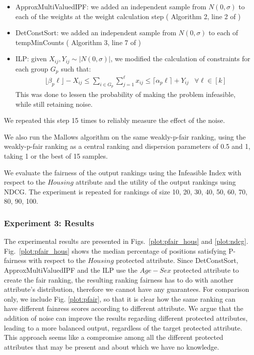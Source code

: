 \begin{itemize}
    \item ApproxMultiValuedIPF: we added an independent sample from $N(0,\sigma)$ to each of the weights at the weight calculation step ( Algorithm 2, line 2 of \cite{RAPF})
    \item DetConstSort: we added an independent sample from $N(0,\sigma)$ to each of tempMinCounts ( Algorithm 3, line 7 of \cite{linkedin})
    \item ILP: given $X_{ij}, Y_{ij} \sim |N(0,\sigma)|$, we modified the calculation of constraints for each group $G_p$ such that:
    \begin{align*}
    & \lfloor \beta_p \ell \rfloor - X_{ij} \leq \sum_{i \in G_p} \sum_{j = 1}^\ell x_{ij}  \leq \lceil \alpha_p \ell \rceil + Y_{ij} & \forall \ell \in [k]
    \end{align*}
    This was done to lessen the probability of making the problem infeasible, while still retaining noise.
\end{itemize}
We repeated this step 15 times to reliably measure the effect of the noise.

We also run the Mallows algorithm on the same weakly-p-fair ranking, using the weakly-p-fair ranking as a central ranking and dispersion parameters of 0.5 and 1, taking 1 or the best of 15 samples.

We evaluate the fairness of the output rankings using the Infeasible Index with respect to the $Housing$ attribute and the utility of the output rankings using NDCG.
The experiment is repeated for rankings of size {10, 20, 30, 40, 50, 60, 70, 80, 90, 100}.

\subsubsection{Experiment 3: Results}

The experimental results are presented in Figs.~\ref{plot:pfair_hous} and \ref{plot:ndcg}. 
Fig.~\ref{plot:pfair_hous} shows the median percentage of positions satisfying P-fairness with respect to the $Housing$ protected attribute. Since DetConstSort,  ApproxMultiValuedIPF and the ILP use the $Age-Sex$ protected attribute to create the fair ranking, the resulting ranking fairness has to do with another attribute's distribution, therefore we cannot have any guarantees.  For comparison only, we include Fig. \ref{plot:pfair}, so that it is clear how the same ranking can have different fainress scores according to different attribute. We argue that the addition of noise can improve the results regarding different protected attributes, leading to a more balanced output, regardless of the target protected attribute. This approach seems like a compromise among all the different protected attributes that may be present and about which we have no knowledge.

